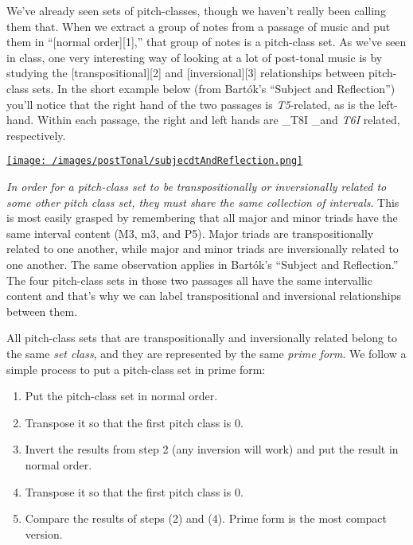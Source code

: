 \documentclass{book}
\providecommand{\tightlist}{%
  \setlength{\itemsep}{0pt}\setlength{\parskip}{0pt}}
\begin{document}
We've already seen sets of pitch-classes, though we haven't really been
calling them that. When we extract a group of notes from a passage of music
and put them in ``{[}normal order{]}{[}1{]},'' that group of notes is a
pitch-class set. As we've seen in class, one very interesting way of looking
at a lot of post-tonal music is by studying the {[}transpositional{]}{[}2{]}
and {[}inversional{]}{[}3{]} relationships between pitch-class sets. In the
short example below (from Bartók's ``Subject and Reflection'') you'll notice
that the right hand of the two passages is \emph{T5}-related, as is the
left-hand. Within each passage, the right and left hands are \_T8I \_and
\emph{T6I} related, respectively.

\href{/images/postTonal/subjecdtAndReflection.png}{\texttt{[image: /images/postTonal/subjecdtAndReflection.png]}}

\emph{In order for a pitch-class set to be transpositionally or inversionally
related to some other pitch class set, they must share the same collection of
intervals}. This is most easily grasped by remembering that all major and
minor triads have the same interval content (M3, m3, and P5). Major triads are
transpositionally related to one another, while major and minor triads are
inversionally related to one another. The same observation applies in Bartók's
``Subject and Reflection.'' The four pitch-class sets in those two passages
all have the same intervallic content and that's why we can label
transpositional and inversional relationships between them.

All pitch-class sets that are transpositionally and inversionally related
belong to the same \emph{set class}, and they are represented by the same
\emph{prime form}. We follow a simple process to put a pitch-class set in
prime form:

\begin{enumerate}
\def\labelenumi{\arabic{enumi}.}
\tightlist
\item
  Put the pitch-class set in normal order.
\item
  Transpose it so that the first pitch class is 0.
\item
  Invert the results from step 2 (any inversion will work) and put the result
  in normal order.
\item
  Transpose it so that the first pitch class is 0.
\item
  Compare the results of steps (2) and (4). Prime form is the most compact
  version.
\end{enumerate}
\end{document}
